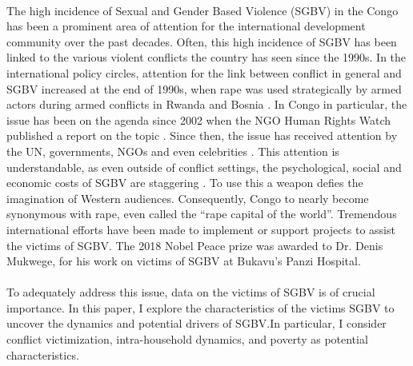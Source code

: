 \documentclass[11pt,a4paper]{scrartcl} %
\begin{document}
\paragraph{}
The high incidence of Sexual and Gender Based Violence (SGBV) in the Congo has been a prominent area of attention for the international development community over the past decades. Often, this high incidence of SGBV has been linked to the various violent conflicts the country has seen since the 1990s. In the international policy circles, attention for the link between conflict in general and SGBV increased at the end of 1990s, when rape was used strategically by armed actors during armed conflicts in Rwanda and Bosnia  \citep{Kirby2015}. In Congo in particular, the issue has been on the agenda since 2002 when the NGO Human Rights Watch published a report on the topic \citep{HRW2002}. Since then, the issue has received attention by the UN, governments, NGOs and even celebrities \citep{Baaz2013}. This attention is understandable, as even outside of conflict settings, the psychological, social and economic costs of SGBV are staggering \citep{Post2002,Peterson2018}. To use this a weapon defies the imagination of Western audiences. Consequently, Congo to nearly become synonymous with rape, even called the ``rape capital of the world''. Tremendous international efforts have been made to implement or support projects to assist the victims of SGBV. The 2018 Nobel Peace prize was awarded to Dr. Denis Mukwege, for his work on victims of SGBV at Bukavu's Panzi Hospital.
 
\paragraph{}
To adequately address this issue, data on the victims of SGBV is of crucial importance. In this paper, I explore the characteristics of the victims SGBV to uncover the dynamics and potential drivers of SGBV.In particular, I consider conflict victimization, intra-household dynamics, and poverty as potential characteristics.
\end{document}
